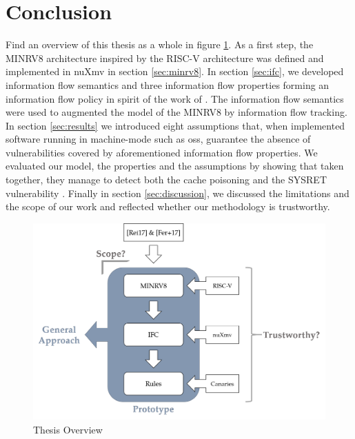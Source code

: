 
\section{Conclusion}
\label{sec:conclusion}

Find an overview of this thesis as a whole in figure \ref{fig:overview}.
As a first step, the MINRV8 architecture inspired by the RISC-V architecture was defined and implemented in nuXmv in section \ref{sec:minrv8}.
In section \ref{sec:ifc}, we developed information flow semantics and three information flow properties forming an information flow policy in spirit of the work of \citeauthor{Ferraiuolo17} \cite{Ferraiuolo17}.
The information flow semantics were used to augmented the model of the MINRV8 by information flow tracking.
In section \ref{sec:results} we introduced eight assumptions that, when implemented software running in machine-mode such as \glspl{os}, guarantee the absence of vulnerabilities covered by aforementioned information flow properties.
We evaluated our model, the properties and the assumptions by showing that taken together, they manage to detect both the cache poisoning \cite{Wojtczuk09} and the SYSRET vulnerability \cite{Dunlap19}.
Finally in section \ref{sec:discussion}, we discussed the limitations and the scope of our work and reflected whether our methodology is trustworthy.

\begin{figure}
    \centering
    \includegraphics[width=\textwidth]{figures/thesis-overview.png}
    \caption{Thesis Overview}
    \label{fig:overview}
\end{figure}

